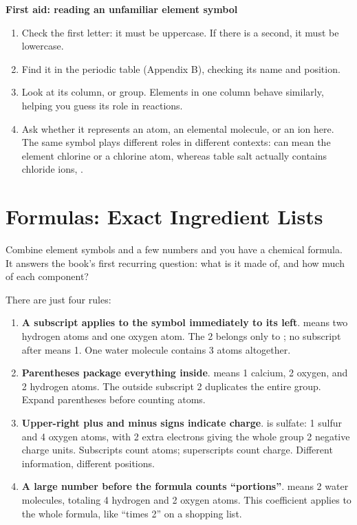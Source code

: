 \textbf{First aid: reading an unfamiliar element symbol}

\begin{enumerate}[itemsep=2pt]
\item Check the first letter: it must be uppercase. If there is a second, it must be lowercase.
\item Find it in the periodic table (Appendix B), checking its name and position.
\item Look at its column, or group. Elements in one column behave similarly, helping you guess its role in reactions.
\item Ask whether it represents an atom, an elemental molecule, or an ion here. The same symbol plays different roles in different contexts:  can mean the element chlorine or a chlorine atom, whereas table salt actually contains chloride ions, .
\end{enumerate}

\section{Formulas: Exact Ingredient Lists}

Combine element symbols and a few numbers and you have a chemical formula. It answers the book's first recurring question: what is it made of, and how much of each component?

There are just four rules:

\begin{enumerate}[itemsep=2pt]
\item \textbf{A subscript applies to the symbol immediately to its left}.  means two hydrogen atoms and one oxygen atom. The 2 belongs only to ; no subscript after  means 1. One water molecule contains 3 atoms altogether.
\item \textbf{Parentheses package everything inside}.  means 1 calcium, 2 oxygen, and 2 hydrogen atoms. The outside subscript 2 duplicates the entire  group. Expand parentheses before counting atoms.
\item \textbf{Upper-right plus and minus signs indicate charge}.  is sulfate: 1 sulfur and 4 oxygen atoms, with 2 extra electrons giving the whole group 2 negative charge units. Subscripts count atoms; superscripts count charge. Different information, different positions.
\item \textbf{A large number before the formula counts ``portions''}.  means 2 water molecules, totaling 4 hydrogen and 2 oxygen atoms. This coefficient applies to the whole formula, like ``times 2'' on a shopping list.
\end{enumerate}

